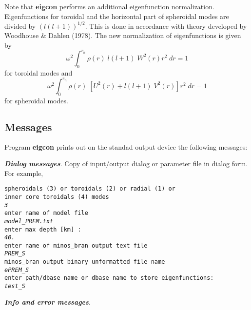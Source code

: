 \noindent Note that {\bf eigcon} performs an additional eigenfunction
normalization. Eigenfunctions for toroidal and the horizontal  
part of spheroidal modes are divided by $(l(l+1))^{1/2}$.
This is done in accordance with theory developed by
Woodhouse \& Dahlen (1978).
The new normalization of eigenfunctions is given by
\[       \omega^2 \int_0^{r_n} \rho(r)\; l(l+1)\;W^{2}(r)r^{2}\;dr = 1 \]
for toroidal modes and
\[       \omega^2 \int_0^{r_n} \rho(r)\; [U^{2}(r)+l(l+1)\;V^{2}(r)]r^{2}\;dr = 1 \]
for spheroidal modes.
%
\subsection{Messages}
Program {\bf eigcon} prints out on the standad output 
device the following messages:

\noindent \textbf {\emph{Dialog messages}}. Copy of input/output dialog
or parameter file in dialog form. For example,

\noindent \texttt {spheroidals (3) or toroidals (2) or radial (1) or  \\
inner core toroidals (4) modes \\
\emph{3} \\
enter name of model file \\
\emph{model\_PREM.txt} \\
enter max depth [km] : \\
\emph{40.} \\
enter name of minos\_bran output text file \\
\emph{PREM\_S} \\
minos\_bran output binary unformatted file name \\
\emph{ePREM\_S} \\
enter path/dbase\_name or dbase\_name to store eigenfunctions: \\
\emph{test\_S} } 

\noindent \textbf {\emph{Info and error messages}}. 

